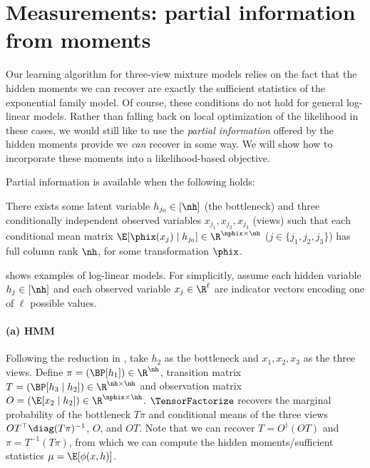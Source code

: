 \section{Measurements: partial information from moments} \label{sec:generalModels}

Our learning algorithm for three-view mixture models relies on the fact that the hidden moments we can recover
are exactly the sufficient statistics of the exponential family model.
Of course, these conditions do not hold for general log-linear models.
Rather than falling back on local optimization of the likelihood in these cases, we would still like
to use the \emph{partial information} offered by the hidden moments provide we
\emph{can} recover in some way.  We will show how to incorporate these moments
into a likelihood-based objective.

Partial information is available when the following holds:
\begin{property}
  There exists some latent variable $h_{j_0} \in [\nh]$ (the bottleneck)
  and three conditionally independent observed variables $x_{j_1},x_{j_2},x_{j_3}$ (views) such that
  each conditional mean matrix $\E[\phix(x_{j}) \mid h_{j_0}] \in \R^{\nphix \times \nh}$ ($j \in \{ j_1, j_2, j_3 \}$) has full column rank $\nh$,
  for some transformation $\phix$.
\end{property}

 shows examples of log-linear models.
For simplicitly, assume each hidden variable $h_j \in [\nh]$ and each observed
variable $x_j \in \R^\ell$ are indicator vectors encoding one of $\ell$ possible values.


\paragraph{(a) HMM}
Following the reduction in \citet{anandkumar12moments},
take $h_2$ as the bottleneck and $x_1, x_2, x_3$ as the three views.
Define $\pi = (\BP[h_1]) \in \R^{\nh}$,
transition matrix $T = (\BP[h_3 \mid h_2]) \in \R^{\nh \times \nh}$
and observation matrix $O = (\E[x_2 \mid h_2]) \in \R^{\nphix \times \nh}$.
$\TensorFactorize$ recovers the marginal probability of the bottleneck
$T \pi$ and conditional means of the three views
$O T^\top \diag(T \pi)^{-1}$,
$O$,
and $O T$.
Note that we can recover $T = O^\dagger(OT)$ and $\pi = T^{-1} (T\pi)$,
from which we can compute the hidden moments/sufficient statistics $\mu = \E[\phi(x,h)]$.

